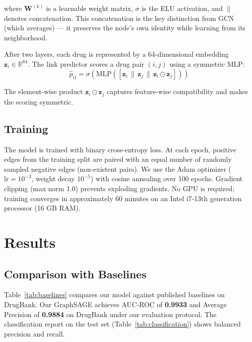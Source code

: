 \documentclass[10pt,twocolumn]{article}
\begin{document}
\noindent where $\mathbf{W}^{(k)}$ is a learnable weight matrix, $\sigma$ is the
ELU activation, and $\|$ denotes concatenation. This concatenation is the key
distinction from GCN (which averages) --- it preserves the node's own identity
while learning from its neighborhood.

After two layers, each drug is represented by a 64-dimensional embedding
$\mathbf{z}_i \in \mathbb{R}^{64}$. The link predictor scores a drug pair
$(i, j)$ using a symmetric MLP:
\begin{equation}
  \hat{p}_{ij} = \sigma\!\left(\mathrm{MLP}\!\left(
    [\mathbf{z}_i \,\|\, \mathbf{z}_j \,\|\, \mathbf{z}_i \odot \mathbf{z}_j]
  \right)\right)
  \label{eq:predictor}
\end{equation}

\noindent The element-wise product $\mathbf{z}_i \odot \mathbf{z}_j$ captures
feature-wise compatibility and makes the scoring symmetric.

\subsection{Training}

The model is trained with binary cross-entropy loss. At each epoch, positive edges
from the training split are paired with an equal number of randomly sampled negative
edges (non-existent pairs). We use the Adam optimizer ($\text{lr} = 10^{-3}$,
weight decay $10^{-5}$) with cosine annealing over 100 epochs. Gradient clipping
(max norm 1.0) prevents exploding gradients. No GPU is required; training converges
in approximately 60 minutes on an Intel i7-13th generation processor (16 GB RAM).

\section{Results}

\subsection{Comparison with Baselines}

Table~\ref{tab:baselines} compares our model against published baselines on
DrugBank. Our GraphSAGE achieves AUC-ROC of \textbf{0.9933} and Average Precision
of \textbf{0.9884} on DrugBank under our evaluation protocol. The classification report on the
test set (Table~\ref{tab:classification}) shows balanced precision and recall.
\end{document}
